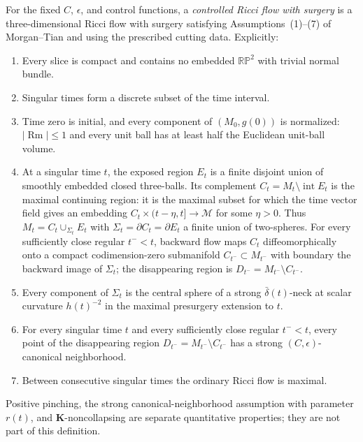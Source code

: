 \begin{definition}
\label{def:controlled-ricci-flow-with-surgery}
\notready
For the fixed $C$, $\epsilon$, and control functions, a
\emph{controlled Ricci flow with surgery} is a three-dimensional Ricci flow
with surgery satisfying Assumptions~(1)--(7) of Morgan--Tian and using the
prescribed cutting data.  Explicitly:
\begin{enumerate}
\item Every slice is compact and contains no embedded $\mathbb{RP}^2$ with
      trivial normal bundle.
\item Singular times form a discrete subset of the time interval.
\item Time zero is initial, and every component of $(M_0,g(0))$ is
      normalized: $|\operatorname{Rm}|\le1$ and every unit ball has at least
      half the Euclidean unit-ball volume.
\item At a singular time $t$, the exposed region $E_t$ is a finite disjoint
      union of smoothly embedded closed three-balls.  Its complement
      $C_t=M_t\setminus\operatorname{int}E_t$ is the maximal continuing
      region: it is the maximal subset for which the time vector field gives
      an embedding $C_t\times(t-\eta,t]\to\mathcal M$ for some $\eta>0$.
      Thus
      $M_t=C_t\cup_{\Sigma_t}E_t$ with
      $\Sigma_t=\partial C_t=\partial E_t$ a finite union of two-spheres.
      For every sufficiently close regular $t^-<t$, backward flow maps $C_t$
      diffeomorphically onto a compact codimension-zero submanifold
      $C_{t^-}\subset M_{t^-}$ with boundary the backward image of
      $\Sigma_t$; the disappearing region is
      $D_{t^-}=M_{t^-}\setminus C_{t^-}$.
\item Every component of $\Sigma_t$ is the central sphere of a strong
      $\bar\delta(t)$-neck at scalar curvature $h(t)^{-2}$ in the maximal
      presurgery extension to $t$.
\item For every singular time $t$ and every sufficiently close regular
      $t^-<t$, every point of the disappearing region
      $D_{t^-}=M_{t^-}\setminus C_{t^-}$ has a strong
      $(C,\epsilon)$-canonical neighborhood.
\item Between consecutive singular times the ordinary Ricci flow is maximal.
\end{enumerate}
Positive pinching, the strong canonical-neighborhood assumption with parameter
$r(t)$, and $\mathbf K$-noncollapsing are separate quantitative properties;
they are not part of this definition.
\end{definition}

